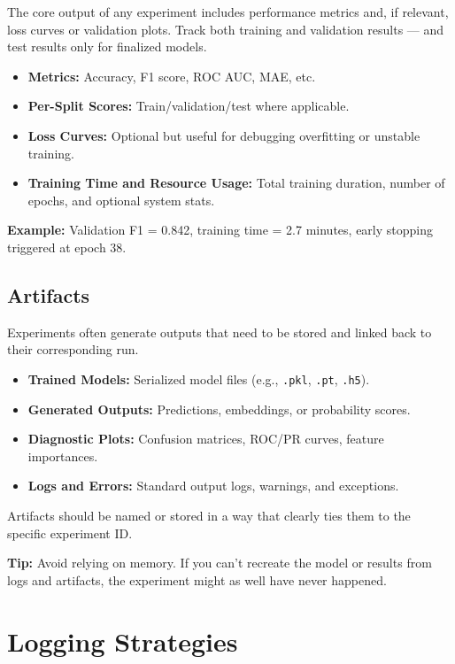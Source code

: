 \documentclass[12pt,openany]{book}
\begin{document}
The core output of any experiment includes performance metrics and, if relevant, loss curves or validation plots. Track both training and validation results — and test results only for finalized models.

\begin{itemize}
    \item \textbf{Metrics:} Accuracy, F1 score, ROC AUC, MAE, etc.
    \item \textbf{Per-Split Scores:} Train/validation/test where applicable.
    \item \textbf{Loss Curves:} Optional but useful for debugging overfitting or unstable training.
    \item \textbf{Training Time and Resource Usage:} Total training duration, number of epochs, and optional system stats.
\end{itemize}

\textbf{Example:} Validation F1 = 0.842, training time = 2.7 minutes, early stopping triggered at epoch 38.

\subsection{Artifacts}

Experiments often generate outputs that need to be stored and linked back to their corresponding run.

\begin{itemize}
    \item \textbf{Trained Models:} Serialized model files (e.g., \texttt{.pkl}, \texttt{.pt}, \texttt{.h5}).
    \item \textbf{Generated Outputs:} Predictions, embeddings, or probability scores.
    \item \textbf{Diagnostic Plots:} Confusion matrices, ROC/PR curves, feature importances.
    \item \textbf{Logs and Errors:} Standard output logs, warnings, and exceptions.
\end{itemize}

Artifacts should be named or stored in a way that clearly ties them to the specific experiment ID.

\textbf{Tip:} Avoid relying on memory. If you can’t recreate the model or results from logs and artifacts, the experiment might as well have never happened.



\section{Logging Strategies}
\end{document}
